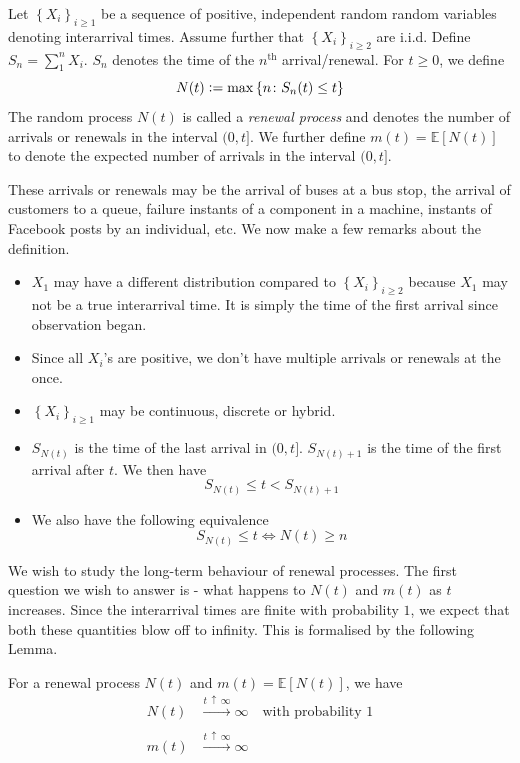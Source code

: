 \documentclass[12pt]{article}
\theoremstyle{definition}
\begin{document}
\begin{defn}
    Let $\left\{ X_i \right\}_{i \geq 1}$ be a sequence of positive, independent random random variables denoting interarrival times. Assume further that $\left\{ X_i \right\}_{i \geq 2}$ are i.i.d. Define $S_n = \sum_1^n X_i$. $S_n$ denotes the time of the $n^{\text{th}}$ arrival/renewal. For $t \geq 0$, we define
    \[
        N(t) \vcentcolon= \max \left\{ n \colon S_n(t) \leq t \right\}
    \]
    The random process $N(t)$ is called a \emph{renewal process} and denotes the number of arrivals or renewals in the interval $(0,t]$. We further define $m(t) = \mathbb{E} \left[ N(t) \right]$ to denote the expected number of arrivals in the interval $(0,t]$.
\end{defn}

These arrivals or renewals may be the arrival of buses at a bus stop, the arrival of customers to a queue, failure instants of a component in a machine, instants of Facebook posts by an individual, etc. We now make a few remarks about the definition. 

\begin{itemize}
    \item $X_1$ may have a different distribution compared to $\left\{ X_i \right\}_{i \geq 2}$ because $X_1$ may not be a true interarrival time. It is simply the time of the first arrival since observation began. 
    \item Since all $X_i$'s are positive, we don't have multiple arrivals or renewals at the once. 
    \item $\left\{ X_i \right\}_{i \geq 1}$ may be continuous, discrete or hybrid.
    \item $S_{N(t)}$ is the time of the last arrival in $(0,t]$. $S_{N(t)+1}$ is the time of the first arrival after $t$. We then have
    \[
        S_{N(t)} \leq t < S_{N(t)+1}
    \]
    \item We also have the following equivalence
    \[
        S_{N(t)} \leq t \iff N(t) \geq n
    \]
\end{itemize}

We wish to study the long-term behaviour of renewal processes. The first question we wish to answer is - what happens to $N(t)$ and $m(t)$ as $t$ increases. Since the interarrival times are finite with probability $1$, we expect that both these quantities blow off to infinity. This is formalised by the following Lemma. 

\begin{lem} \label{lem:ren_1}
    For a renewal process $N(t)$ and $m(t) = \mathbb{E} \left[ N(t) \right]$, we have
    \begin{align}
        N(t) &\xrightarrow[]{t \, \uparrow \, \infty} \infty \quad \text{with probability } 1 \\
        m(t) &\xrightarrow[]{t \, \uparrow \, \infty} \infty
    \end{align}
\end{lem}
\end{document}
